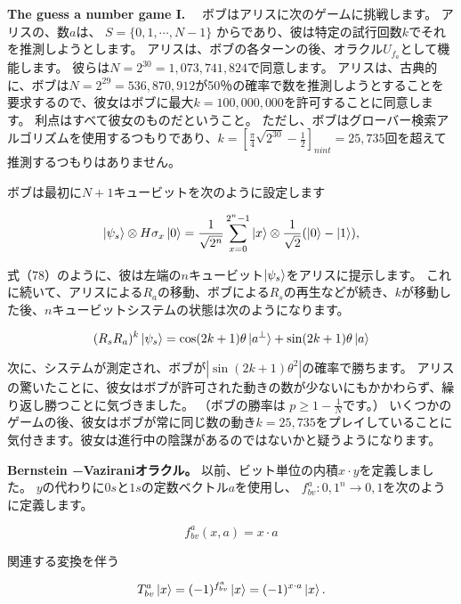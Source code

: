 \textbf{The guess a number game I.　}
ボブはアリスに次のゲームに挑戦します。 アリスの、数$a$は、
$S = \{ 0,1, \cdots , N − 1 \} $ からであり、彼は特定の試行回数$k$でそれを推測しようとします。
アリスは、ボブの各ターンの後、オラクル$U_{f_a}$として機能します。
彼らは$N = 2^{30} = 1,073,741,824$で同意します。
アリスは、古典的に、ボブは$N = 2^{29} = 536,870,912$が50％の確率で数を推測しようとすることを要求するので、彼女はボブに最大$k = 100,000,000$を許可することに同意します。
利点はすべて彼女のものだということ。 ただし、ボブはグローバー検索アルゴリズムを使用するつもりであり、$k = [ \frac{\pi}{4} \sqrt{2^{30}} − \frac{1}{2}]_{nint} = 25,735$回を超えて推測するつもりはありません。

ボブは最初に$N + 1$キュービットを次のように設定します

\begin{equation}
\label{96}
\ket{\psi_s} \otimes H \sigma_x \ket{0}
=
\frac{1}{\sqrt{2^n}}
\sum_{x=0}^{2^n -1} \ket{x}
\otimes
\frac{1}{\sqrt{2}}(\ket{0} - \ket{1}),
\end{equation}

式（78）のように、彼は左端の$n$キュービット$\ket{\psi_s}$をアリスに提示します。 これに続いて、アリスによる$R_a$の移動、ボブによる$R_s$の再生などが続き、$k$が移動した後、$n$キュービットシステムの状態は次のようになります。

\begin{equation}
\label{97}
(R_s R_a)^k \ket{\psi_s} = 
\cos ( 2k +1 ) \theta \ket{a^{\bot}} 
+ \sin ( 2k + 1 ) \theta \ket{a}
\end{equation}

次に、システムが測定され、ボブが$| \sin(2k + 1) \theta ^2 | $の確率で勝ちます。
アリスの驚いたことに、彼女はボブが許可された動きの数が少ないにもかかわらず、繰り返し勝つことに気づきました。
（ボブの勝率は $p \ge 1 − \frac{1}{N} $です。）
いくつかのゲームの後、彼女はボブが常に同じ数の動き$k = 25,735$をプレイしていることに気付きます。彼女は進行中の陰謀があるのではないかと疑うようになります。

\textbf{Bernstein −Vaziraniオラクル。}
以前、ビット単位の内積$x \cdot y$を定義しました。 $y$の代わりに$0s$と$1s$の定数ベクトル$a$を使用し、
$ f_{bv}^{a} : { 0,1 }^n \to {0,1} $を次のように定義します。


\begin{equation}
\label{98}
f_{bv}^{a} (x, a) = x \cdot a
\end{equation}

関連する変換を伴う

\begin{equation}
\label{99}
T^a_{bv} \ket{x} = (-1) ^{f^a_{bv}} \ket{x} = (-1) ^{x \cdot a} \ket{x}.
\end{equation}


